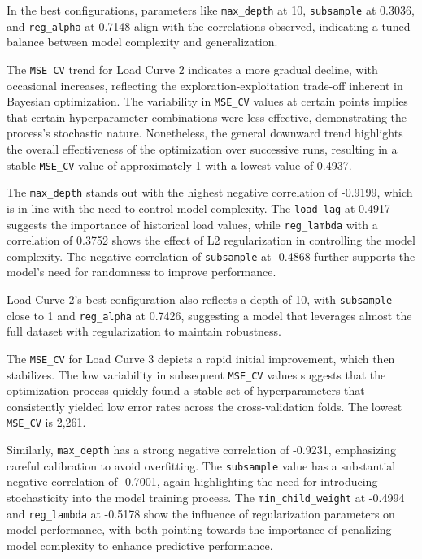 \documentclass{article} %
\begin{document}
In the best configurations, parameters like \texttt{max\_depth} at 10, \texttt{subsample} at 0.3036, and \texttt{reg\_alpha} at 0.7148 align with the correlations observed, indicating a tuned balance between model complexity and generalization.


The \texttt{MSE\_CV} trend for Load Curve 2 indicates a more gradual decline, with occasional increases, reflecting the exploration-exploitation trade-off inherent in Bayesian optimization. The variability in \texttt{MSE\_CV} values at certain points implies that certain hyperparameter combinations were less effective, demonstrating the process's stochastic nature. Nonetheless, the general downward trend highlights the overall effectiveness of the optimization over successive runs, resulting in a stable \texttt{MSE\_CV} value of approximately 1 with a lowest value of 0.4937.

The \texttt{max\_depth} stands out with the highest negative correlation of -0.9199, which is in line with the need to control model complexity. The \texttt{load\_lag} at 0.4917 suggests the importance of historical load values, while \texttt{reg\_lambda} with a correlation of 0.3752 shows the effect of L2 regularization in controlling the model complexity. The negative correlation of \texttt{subsample} at -0.4868 further supports the model's need for randomness to improve performance.

Load Curve 2's best configuration also reflects a depth of 10, with \texttt{subsample} close to 1 and \texttt{reg\_alpha} at 0.7426, suggesting a model that leverages almost the full dataset with regularization to maintain robustness.

The \texttt{MSE\_CV} for Load Curve 3 depicts a rapid initial improvement, which then stabilizes. The low variability in subsequent \texttt{MSE\_CV} values suggests that the optimization process quickly found a stable set of hyperparameters that consistently yielded low error rates across the cross-validation folds. The lowest \texttt{MSE\_CV} is 2,261.

Similarly, \texttt{max\_depth} has a strong negative correlation of -0.9231, emphasizing careful calibration to avoid overfitting. The \texttt{subsample} value has a substantial negative correlation of -0.7001, again highlighting the need for introducing stochasticity into the model training process. The \texttt{min\_child\_weight} at -0.4994 and \texttt{reg\_lambda} at -0.5178 show the influence of regularization parameters on model performance, with both pointing towards the importance of penalizing model complexity to enhance predictive performance.
\end{document}
